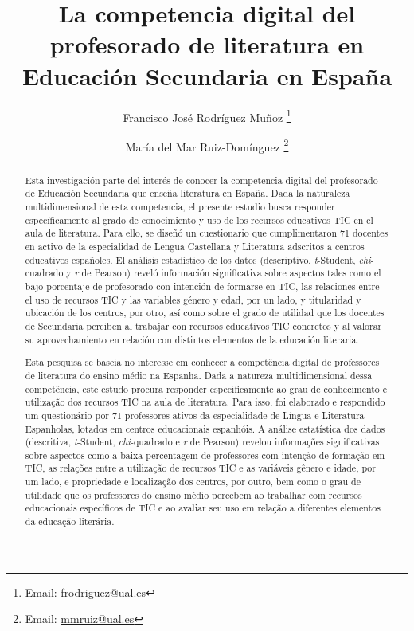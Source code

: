 \documentclass[spanish]{textolivre}
\title{La competencia digital del profesorado de literatura en Educación Secundaria en España}
\author[1]{Francisco José Rodríguez Muñoz \orcid{0000-0001-6071-509X} \thanks{Email: \url{frodriguez@ual.es}}}
\author[1]{María del Mar Ruiz-Domínguez \orcid{0000-0003-2107-3682} \thanks{Email: \url{mmruiz@ual.es}}}
\affil[1]{Universidad de Almería, Departamento de Educación, Almería, Andalucía, España.}
\begin{document}
\maketitle

\begin{polyabstract}
\begin{abstract}
Esta investigación parte del interés de conocer la competencia digital del profesorado de Educación Secundaria que enseña literatura en España. Dada la naturaleza multidimensional de esta competencia, el presente estudio busca responder específicamente al grado de conocimiento y uso de los recursos educativos TIC en el aula de literatura. Para ello, se diseñó un cuestionario que cumplimentaron 71 docentes en activo de la especialidad de Lengua Castellana y Literatura adscritos a centros educativos españoles. El análisis estadístico de los datos (descriptivo, \textit{t}-Student, \textit{chi}-cuadrado y \textit{r} de Pearson) reveló información significativa sobre aspectos tales como el bajo porcentaje de profesorado con intención de formarse en TIC, las relaciones entre el uso de recursos TIC y las variables género y edad, por un lado, y titularidad y ubicación de los centros, por otro, así como sobre el grado de utilidad que los docentes de Secundaria perciben al trabajar con recursos educativos TIC concretos y al valorar su aprovechamiento en relación con distintos elementos de la educación literaria.

\end{abstract}

\begin{portuguese}
\begin{abstract}
Esta pesquisa se baseia no interesse em conhecer a competência digital de professores de literatura do ensino médio na Espanha. Dada a natureza multidimensional dessa competência, este estudo procura responder especificamente ao grau de conhecimento e utilização dos recursos TIC na aula de literatura. Para isso, foi elaborado e respondido um questionário por 71 professores ativos da especialidade de Língua e Literatura Espanholas, lotados em centros educacionais espanhóis. A análise estatística dos dados (descritiva, \textit{t}-Student, \textit{chi}-quadrado e \textit{r} de Pearson) revelou informações significativas sobre aspectos como a baixa percentagem de professores com intenção de formação em TIC, as relações entre a utilização de recursos TIC e as variáveis gênero e idade, por um lado, e propriedade e localização dos centros, por outro, bem como o grau de utilidade que os professores do ensino médio percebem ao trabalhar com recursos educacionais específicos de TIC e ao avaliar seu uso em relação a diferentes elementos da educação literária.


\end{abstract}
\end{portuguese}
\end{polyabstract}
\end{document}
